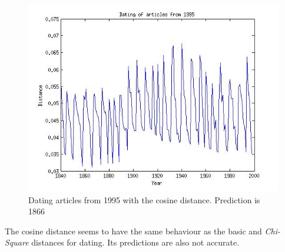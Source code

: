 \begin{figure}[H]
\begin{minipage}[b]{0.3\linewidth}
	\includegraphics[scale=0.25]{Pictures/date_articles/cos/dating1995_corrected.jpg}
        \caption{Dating articles from 1995 with the cosine distance. Prediction is 1866}
        \label{date_cos}
    \end{minipage}
\end{figure}
The cosine distance seems to have the same behaviour as the basic and \emph{Chi-Square} distances for dating. Its predictions are also not accurate.